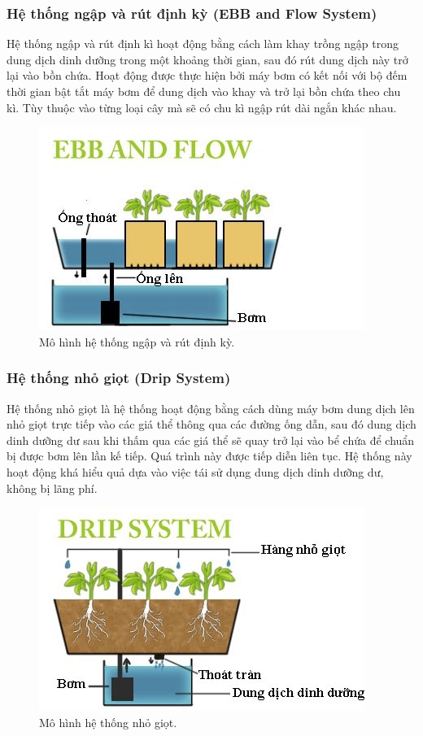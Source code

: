\documentclass[a4paper,12pt,oneside]{article}
\begin{document}
\subsubsection{Hệ thống ngập và rút định kỳ (EBB and Flow System)}

\noindent Hệ thống ngập và rút định kì hoạt động bằng cách làm khay trồng ngập trong dung dịch dinh dưỡng trong một khoảng thời gian, sau đó rút dung dịch này trở lại vào bồn chứa. Hoạt động được thực hiện bởi máy bơm có kết nối với bộ đếm thời gian bật tắt máy bơm để dung dịch vào khay và trở lại bồn chứa theo chu kì. Tùy thuộc vào từng loại cây mà sẽ có chu kì ngập rút dài ngắn khác nhau.

\begin{figure}[H]
	\centering
	\includegraphics[scale=.9]{hinh/ebb_flow.jpg}
	\caption{Mô hình hệ thống ngập và rút định kỳ\cite{thuycanh}.}
	\label{fig:ebb_flow}
\end{figure}

\subsubsection{Hệ thống nhỏ giọt (Drip System)}
\noindent Hệ thống nhỏ giọt là hệ thống hoạt động bằng cách dùng máy bơm dung dịch lên nhỏ giọt trực tiếp vào các giá thể thông qua các đường ống dẫn, sau đó dung dịch dinh dưỡng dư sau khi thấm qua các giá thể sẽ quay trở lại vào bể chứa để chuẩn bị được bơm lên lần kế tiếp. Quá trình này được tiếp diễn liên tục. Hệ thống này hoạt động khá hiểu quả dựa vào việc tái sử dụng dung dịch dinh dưỡng dư, không bị lãng phí.

\begin{figure}[H]
	\centering
	\includegraphics[scale=.9]{hinh/Drip_system.jpg}
	\caption{Mô hình hệ thống nhỏ giọt\cite{thuycanh}.}
	\label{fig:Drip_system}
\end{figure}
\end{document}
